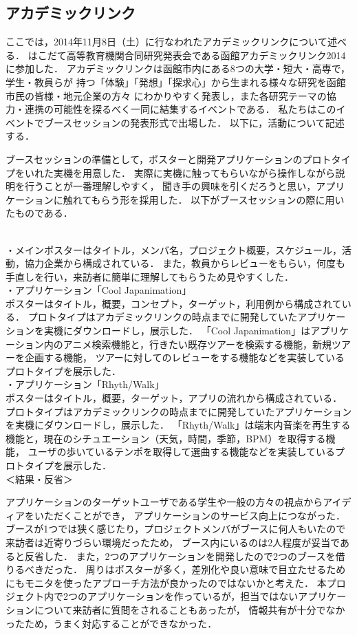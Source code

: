 \subsection{アカデミックリンク}
\par
ここでは，2014年11月8日（土）に行なわれたアカデミックリンクについて述べる．
はこだて高等教育機関合同研究発表会である函館アカデミックリンク2014に参加した．
アカデミックリンクは函館市内にある8つの大学・短大・高専で，学生・教員らが
持つ「体験」「発想」「探求心」から生まれる様々な研究を函館市民の皆様・地元企業の方々
にわかりやすく発表し，また各研究テーマの協力・連携の可能性を探るべく一同に結集するイベントである．
私たちはこのイベントでブースセッションの発表形式で出場した．
以下に，活動について記述する．
\par
ブースセッションの準備として，ポスターと開発アプリケーションのプロトタイプをいれた実機を用意した．
実際に実機に触ってもらいながら操作しながら説明を行うことが一番理解しやすく，
聞き手の興味を引くだろうと思い，アプリケーションに触れてもらう形を採用した．
以下がブースセッションの際に用いたものである．

\\
・メインポスターはタイトル，メンバ名，プロジェクト概要，スケジュール，活動，協力企業から構成されている．
また，教員からレビューをもらい，何度も手直しを行い，来訪者に簡単に理解してもらうため見やすくした．
\\
・アプリケーション「Cool Japanimation」\\
ポスターはタイトル，概要，コンセプト，ターゲット，利用例から構成されている．
プロトタイプはアカデミックリンクの時点までに開発していたアプリケーションを実機にダウンロードし，展示した．
「Cool Japanimation」はアプリケーション内のアニメ検索機能と，行きたい既存ツアーを検索する機能，新規ツアーを企画する機能，
ツアーに対してのレビューをする機能などを実装しているプロトタイプを展示した．
\\
・アプリケーション「Rhyth/Walk」\\
ポスターはタイトル，概要，ターゲット，アプリの流れから構成されている．
プロトタイプはアカデミックリンクの時点までに開発していたアプリケーションを実機にダウンロードし，展示した．
「Rhyth/Walk」は端末内音楽を再生する機能と，現在のシチュエーション（天気，時間，季節，BPM）を取得する機能，
ユーザの歩いているテンポを取得して選曲する機能などを実装しているプロトタイプを展示した．
\\
＜結果・反省＞
\par
アプリケーションのターゲットユーザである学生や一般の方々の視点からアイディアをいただくことができ，
アプリケーションのサービス向上につながった．
ブースが1つでは狭く感じたり，プロジェクトメンバがブースに何人もいたので来訪者は近寄りづらい環境だったため，
ブース内にいるのは2人程度が妥当であると反省した．
また，2つのアプリケーションを開発したので2つのブースを借りるべきだった．
周りはポスターが多く，差別化や良い意味で目立たせるためにもモニタを使ったアプローチ方法が良かったのではないかと考えた．
本プロジェクト内で2つのアプリケーションを作っているが，担当ではないアプリケーションについて来訪者に質問をされることもあったが，
情報共有が十分でなかったため，うまく対応することができなかった．

\par
